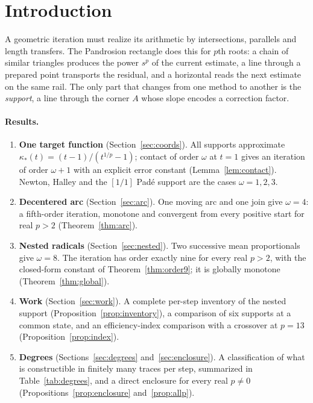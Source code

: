 \documentclass[10pt,a4paper]{article}
\theoremstyle{plain}
\theoremstyle{remark}
\numberwithin{equation}{section}
\begin{document}
\section{Introduction}

A geometric iteration must realize its arithmetic by intersections, parallels and length transfers.
The Pandrosion rectangle does this for $p$th roots: a chain of similar triangles produces the power
$s^p$ of the current estimate, a line through a prepared point transports the residual, and a horizontal
reads the next estimate on the same rail. The only part that changes from one method to another is the
\emph{support}, a line through the corner $A$ whose slope encodes a correction factor.

\paragraph{Results.}
\begin{enumerate}[label=\arabic*.]
\item \textbf{One target function} (Section~\ref{sec:coords}). All supports approximate
  $\kappa_*(t)=(t-1)/(t^{1/p}-1)$; contact of order $\omega$ at $t=1$ gives an iteration of order $\omega+1$ with
  an explicit error constant (Lemma~\ref{lem:contact}). Newton, Halley and the $[1/1]$ Pad\'e support are
  the cases $\omega=1,2,3$.
\item \textbf{Decentered arc} (Section~\ref{sec:arc}). One moving arc and one join give $\omega=4$:
  a fifth-order iteration, monotone and convergent from every positive start for real $p>2$
  (Theorem~\ref{thm:arc}).
\item \textbf{Nested radicals} (Section~\ref{sec:nested}). Two successive mean proportionals give
  $\omega=8$. The iteration has order exactly nine for every real $p>2$, with the closed-form constant of
  Theorem~\ref{thm:order9}; it is globally monotone (Theorem~\ref{thm:global}).
\item \textbf{Work} (Section~\ref{sec:work}). A complete per-step inventory of the nested support
  (Proposition~\ref{prop:inventory}), a comparison of six supports at a common state, and an
  efficiency-index comparison with a crossover at $p=13$ (Proposition~\ref{prop:index}).
\item \textbf{Degrees} (Sections~\ref{sec:degrees} and~\ref{sec:enclosure}). A classification of what
  is constructible in finitely many traces per step, summarized in Table~\ref{tab:degrees}, and a direct
  enclosure for every real $p\neq 0$ (Propositions~\ref{prop:enclosure} and~\ref{prop:allp}).
\end{enumerate}
\end{document}
